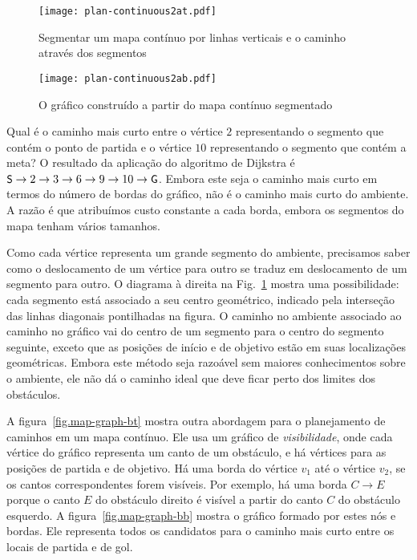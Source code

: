 {\begin{figure}
\begin{center}
\texttt{[image: plan-continuous2at.pdf]}
\end{center}
\caption{Segmentar um mapa contínuo por linhas verticais e o caminho através dos segmentos}\label{fig.map-graph-at}
\end{figure}

\begin{figure}
\begin{center}
\texttt{[image: plan-continuous2ab.pdf]}
\end{center}
\caption{O gráfico construído a partir do mapa contínuo segmentado}\label{fig.map-graph-ab}
\end{figure}

Qual é o caminho mais curto entre o vértice $2$ representando o segmento que contém o ponto de partida e o vértice $10$ representando o segmento que contém a meta? O resultado da aplicação do algoritmo de Dijkstra é $\textsf{\small S} \rightarrow 2\rightarrow 3\rightarrow 6\rightarrow 9\rightarrow 10 \rightarrow \textsf{\small G}$. Embora este seja o caminho mais curto em termos do número de bordas do gráfico, não é o caminho mais curto do ambiente. A razão é que atribuímos custo constante a cada borda, embora os segmentos do mapa tenham vários tamanhos. 

Como cada vértice representa um grande segmento do ambiente, precisamos saber como o deslocamento de um vértice para outro se traduz em deslocamento de um segmento para outro. O diagrama à direita na Fig.~\ref{fig.map-graph-at} mostra uma possibilidade: cada segmento está associado a seu centro geométrico, indicado pela interseção das linhas diagonais pontilhadas na figura. O caminho no ambiente associado ao caminho no gráfico vai do centro de um segmento para o centro do segmento seguinte, exceto que as posições de início e de objetivo estão em suas localizações geométricas. Embora este método seja razoável sem maiores conhecimentos sobre o ambiente, ele não dá o caminho ideal que deve ficar perto dos limites dos obstáculos.

A figura~\ref{fig.map-graph-bt} mostra outra abordagem para o planejamento de caminhos em um mapa contínuo. Ele usa um gráfico de \emph{visibilidade}, onde cada vértice do gráfico representa um canto de um obstáculo, e há vértices para as posições de partida e de objetivo. Há uma borda do vértice $v_1$ até o vértice $v_2$, se os cantos correspondentes forem visíveis. Por exemplo, há uma borda $C\rightarrow E$ porque o canto $E$ do obstáculo direito é visível a partir do canto $C$ do obstáculo esquerdo. A figura~\ref{fig.map-graph-bb} mostra o gráfico formado por estes nós e bordas. Ele representa todos os candidatos para o caminho mais curto entre os locais de partida e de gol.

}

